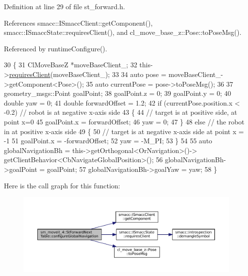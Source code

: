 Definition at line 29 of file st\+\_\+forward.\+h.



References smacc\+::\+I\+Smacc\+Client\+::get\+Component(), smacc\+::\+I\+Smacc\+State\+::requires\+Client(), and cl\+\_\+move\+\_\+base\+\_\+z\+::\+Pose\+::to\+Pose\+Msg().



Referenced by runtime\+Configure().


\begin{DoxyCode}
30   \{
31     ClMoveBaseZ *moveBaseClient\_;
32     this->\hyperlink{classsmacc_1_1ISmaccState_a7f95c9f0a6ea2d6f18d1aec0519de4ac}{requiresClient}(moveBaseClient\_);
33 
34     \textcolor{keyword}{auto} pose = moveBaseClient\_->getComponent<Pose>();
35     \textcolor{keyword}{auto} currentPose = pose->toPoseMsg();
36 
37     geometry\_msgs::Point goalPoint;
38     goalPoint.z = 0;
39     goalPoint.y = 0;
40     \textcolor{keywordtype}{double} yaw = 0;
41     \textcolor{keywordtype}{double} forwardOffset = 1.2;
42     \textcolor{keywordflow}{if} (currentPose.position.x < -0.2)  \textcolor{comment}{// robot is at negative x-axis side}
43     \{
44       \textcolor{comment}{// target is at positive side, at point x=0}
45       goalPoint.x = forwardOffset;
46       yaw = 0;
47     \}
48     \textcolor{keywordflow}{else}  \textcolor{comment}{// the robot in at positive x-axis side}
49     \{
50       \textcolor{comment}{// target is at negative x-axis side at point x = -1}
51       goalPoint.x = -forwardOffset;
52       yaw = -M\_PI;
53     \}
54 
55     \textcolor{keyword}{auto} globalNavigationBh = this->getOrthogonal<OrNavigation>()->
      getClientBehavior<CbNavigateGlobalPosition>();
56     globalNavigationBh->goalPoint = goalPoint;
57     globalNavigationBh->goalYaw = yaw;
58   \}
\end{DoxyCode}
Here is the call graph for this function\+:
\nopagebreak
\begin{figure}[H]
\begin{center}
\leavevmode
\includegraphics[width=350pt]{structsm__moveit__4_1_1StForwardNextTable_abda625487098c60f3d0507092aba19ce_cgraph}
\end{center}
\end{figure}
